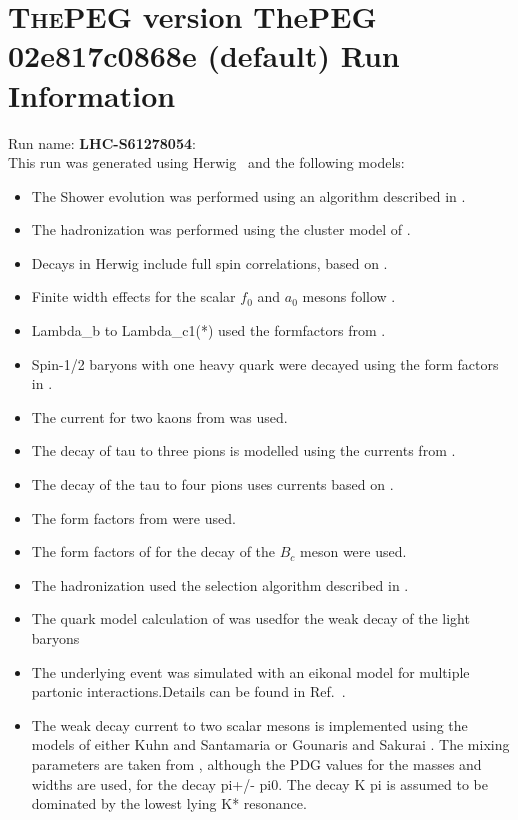 \documentclass{article}
\begin{document}
\appendix
\section[xxx]{\textsc{ThePEG} version ThePEG 02e817c0868e (default) \cite{ThePEG} Run Information}
Run name: \textbf{LHC-S61278054}:\\
This run was generated using Herwig~\cite{Bahr:2008pv} and the following models:
\begin{itemize}
\item The Shower evolution was performed using an algorithm described in \cite{Marchesini:1983bm,Marchesini:1987cf,Gieseke:2003rz,Bahr:2008pv}.
\item The hadronization was performed using the cluster model of \cite{Webber:1983if}.
\item Decays in Herwig include full spin correlations, based on \cite{Richardson:2001df}.
\item Finite width effects for the scalar $f_0$ and $a_0$ mesons follow \cite{Flatte:1976xu}.
\item Lambda_b to Lambda_c1(*) used the formfactors from \cite{Huang:2000xw}.
\item Spin-1/2 baryons with one heavy quark were decayed using the form factors in \cite{Singleton:1990ye}.
\item The current for two kaons from \cite{Czyz:2010hj} was used.
\item The decay of tau to three pions is modelled using the currents from \cite{Asner:1999kj}.
\item The decay of the tau to four pions uses currents based on \cite{Bondar:2002mw}.
\item The form factors from \cite{Ivanov:1996fj} were used.
\item The form factors of \cite{Kiselev:2002vz} for the decay of the $B_c$ meson were used.
\item The hadronization used the selection algorithm described in \cite{Kupco:1998fx}.
\item The quark model calculation of \cite{Schlumpf:1994fb} was usedfor the weak decay of the light baryons
\item The underlying event was simulated with an eikonal model for multiple partonic interactions.Details can be found in Ref.~\cite{Bahr:2008dy,Bahr:2009ek}.
\item The weak decay current to two scalar mesons is implemented using the models of either Kuhn and Santamaria \cite{Kuhn:1990ad} or Gounaris and Sakurai \cite{Gounaris:1968mw}. The mixing parameters are taken from \cite{Asner:1999kj}, although the PDG values for the masses and widths are used, for the decay pi+/- pi0. The decay K pi is assumed to  be dominated by the lowest lying K* resonance.

\end{itemize}
\end{document}
